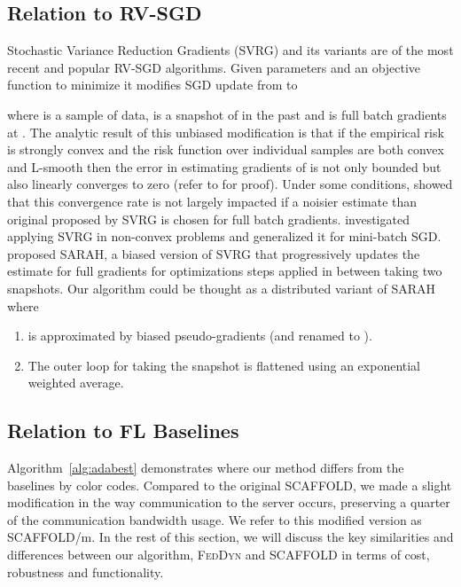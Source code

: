\documentclass[runningheads]{llncs}
\def\algref#1{Algorithm~\ref{#1}}
\newcommand{\scaffold}{\textsc{SCAFFOLD}\xspace}
\newcommand{\feddyn}{\textsc{FedDyn}\xspace}
\newcommand{\sgd}{\textsc{SGD}\xspace}
\newcommand{\rvsgd}{\textsc{RV-SGD}\xspace}
\newcommand{\svrg}{\textsc{SVRG}\xspace}
\newcommand{\sarah}{\textsc{SARAH}\xspace}
\begin{document}
\subsection{Relation to \rvsgd}
Stochastic Variance Reduction Gradients (\svrg) \cite{johnson2013accelerating} and its variants\cite{nguyen2017sarah,bi2021variance,konevcny2014ms2gd,babanezhad2015stopwasting,xiao2014proximal} are of the most recent and popular \rvsgd algorithms. Given parameters  and an objective function  to minimize it modifies \sgd update from  to

where  is a sample of data,  is a snapshot of  in the past and  is full batch gradients at . The analytic result of this unbiased modification is that if the empirical risk is strongly convex and the risk function over individual samples are both convex and L-smooth  then the error in estimating gradients of  is not only bounded but also linearly converges to zero (refer to \cite{johnson2013accelerating} for proof). Under some conditions, \cite{babanezhad2015stopwasting} showed that this convergence rate is not largely impacted if a noisier estimate than original  proposed by \svrg is chosen for full batch gradients. \cite{bi2021variance} investigated applying \svrg in non-convex problems and \cite{konevcny2014ms2gd} generalized it for mini-batch \sgd. \cite{nguyen2017sarah} proposed \sarah, a biased version of \svrg that progressively updates the estimate for full gradients for optimizations steps applied in between taking two snapshots. 
Our algorithm could be thought as a distributed variant of \sarah where 
\begin{enumerate}
    \item  is approximated by biased pseudo-gradients (and renamed to ).
    \item The outer loop for taking the snapshot is flattened using an exponential weighted average.
\end{enumerate}    



\subsection{Relation to FL Baselines}
\label{sec:compare}
\algref{alg:adabest} demonstrates where our method differs from the baselines by color codes.
Compared to the original \scaffold, we made a slight modification in the way communication to the server occurs, preserving a quarter of the communication bandwidth usage.
We refer to this modified version as \scaffold/m.
In the rest of this section, we will discuss the key similarities and differences between our algorithm, \feddyn and \scaffold in terms of cost, robustness and functionality. 
\end{document}
